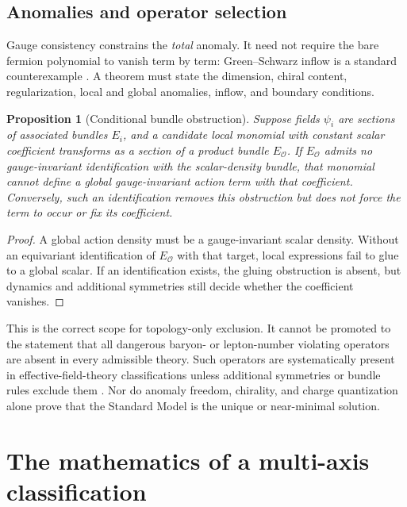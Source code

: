 \documentclass[11pt]{article}
\newtheorem{proposition}[theorem]{Proposition}
\theoremstyle{definition}
\theoremstyle{remark}
\begin{document}
\subsection{Anomalies and operator selection}

Gauge consistency constrains the \emph{total} anomaly. It need not require the
bare fermion polynomial to vanish term by term: Green--Schwarz inflow is a
standard counterexample \cite{GreenSchwarz1984}. A theorem must state the
dimension, chiral content, regularization, local and global anomalies, inflow,
and boundary conditions.

\begin{proposition}[Conditional bundle obstruction]
\label{prop:bundle-obstruction}
Suppose fields \(\psi_i\) are sections of associated bundles \(E_i\), and a
candidate local monomial with constant scalar coefficient transforms as a
section of a product bundle \(E_{\mathcal O}\). If \(E_{\mathcal O}\) admits no
gauge-invariant identification with the scalar-density bundle, that monomial
cannot define a global gauge-invariant action term with that coefficient.
Conversely, such an identification removes this obstruction but does not force
the term to occur or fix its coefficient.
\end{proposition}

\begin{proof}
A global action density must be a gauge-invariant scalar density. Without an
equivariant identification of \(E_{\mathcal O}\) with that target, local
expressions fail to glue to a global scalar. If an identification exists, the
gluing obstruction is absent, but dynamics and additional symmetries still
decide whether the coefficient vanishes.
\end{proof}

This is the correct scope for topology-only exclusion. It cannot be promoted to
the statement that all dangerous baryon- or lepton-number violating operators
are absent in every admissible theory. Such operators are systematically
present in effective-field-theory classifications unless additional symmetries
or bundle rules exclude them \cite{Weinberg1979}. Nor do anomaly freedom,
chirality, and charge quantization alone prove that the Standard Model is the
unique or near-minimal solution.

\section{The mathematics of a multi-axis classification}
\label{sec:classification}
\end{document}
